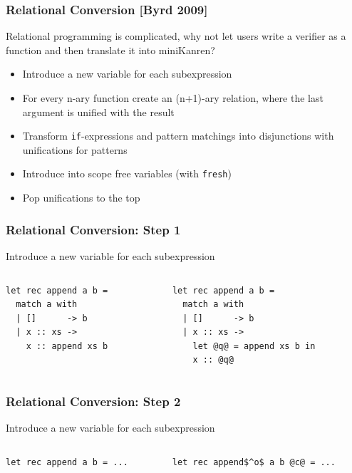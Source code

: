 \documentclass[xcolor=table]{beamer}
\begin{document}
\begin{frame}[fragile]
  \transwipe[direction=90]
  \frametitle{Relational Conversion [Byrd 2009]}

Relational programming is complicated, why not let users write a verifier as a function and then translate it into miniKanren?

\begin{itemize}
  \item Introduce a new variable for each subexpression
  \item For every n-ary function create an (n+1)-ary relation, where the last argument is unified with the result
  \item Transform \lstinline{if}-expressions and pattern matchings into disjunctions with unifications for patterns
  \item Introduce into scope free variables (with \lstinline{fresh})
  \item Pop unifications to the top
\end{itemize}
\end{frame}

\begin{frame}[fragile]
  \transwipe[direction=90]
  \frametitle{Relational Conversion: Step 1}
  
Introduce a new variable for each subexpression

\begin{columns}
\begin{column}{0.5\textwidth}
\begin{lstlisting}
let rec append a b =
  match a with
  | []      -> b
  | x :: xs -> 
    x :: append xs b
\end{lstlisting}
\end{column}
\begin{column}{0.5\textwidth}  
\begin{lstlisting}
let rec append a b =
  match a with 
  | []      -> b
  | x :: xs -> 
    let @q@ = append xs b in
    x :: @q@
\end{lstlisting}
\end{column}
\end{columns}
\end{frame}


\begin{frame}[fragile]
  \transwipe[direction=90]
  \frametitle{Relational Conversion: Step 2}
  
Introduce a new variable for each subexpression

\begin{columns}
\begin{column}{0.5\textwidth}
\begin{lstlisting}
let rec append a b = ...
\end{lstlisting}
\end{column}
\begin{column}{0.5\textwidth}  
\begin{lstlisting}
let rec append$^o$ a b @c@ = ...
\end{lstlisting}
\end{column}
\end{columns}  
\end{frame}
\end{document}
